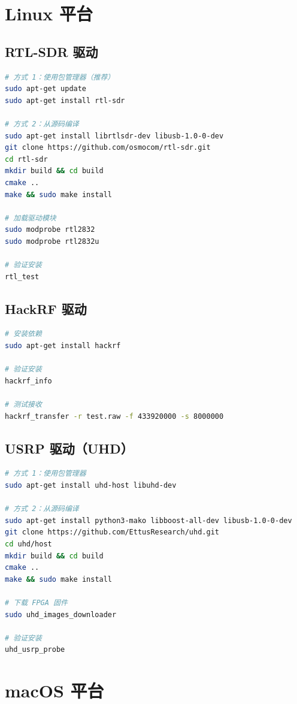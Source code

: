 \documentclass[12pt,UTF8]{ctexbook}
\begin{document}
\section{Linux 平台}
\label{sec:driver_linux}

\subsection{RTL-SDR 驱动}
\begin{lstlisting}[language=Bash,caption={Linux 安装 RTL-SDR 驱动}]
# 方式 1：使用包管理器（推荐）
sudo apt-get update
sudo apt-get install rtl-sdr

# 方式 2：从源码编译
sudo apt-get install librtlsdr-dev libusb-1.0-0-dev
git clone https://github.com/osmocom/rtl-sdr.git
cd rtl-sdr
mkdir build && cd build
cmake ..
make && sudo make install

# 加载驱动模块
sudo modprobe rtl2832
sudo modprobe rtl2832u

# 验证安装
rtl_test
\end{lstlisting}

\subsection{HackRF 驱动}
\begin{lstlisting}[language=Bash,caption={Linux 安装 HackRF 驱动}]
# 安装依赖
sudo apt-get install hackrf

# 验证安装
hackrf_info

# 测试接收
hackrf_transfer -r test.raw -f 433920000 -s 8000000
\end{lstlisting}

\subsection{USRP 驱动（UHD）}
\begin{lstlisting}[language=Bash,caption={Linux 安装 UHD 驱动}]
# 方式 1：使用包管理器
sudo apt-get install uhd-host libuhd-dev

# 方式 2：从源码编译
sudo apt-get install python3-mako libboost-all-dev libusb-1.0-0-dev
git clone https://github.com/EttusResearch/uhd.git
cd uhd/host
mkdir build && cd build
cmake ..
make && sudo make install

# 下载 FPGA 固件
sudo uhd_images_downloader

# 验证安装
uhd_usrp_probe
\end{lstlisting}

\section{macOS 平台}
\label{sec:driver_macos}
\end{document}
